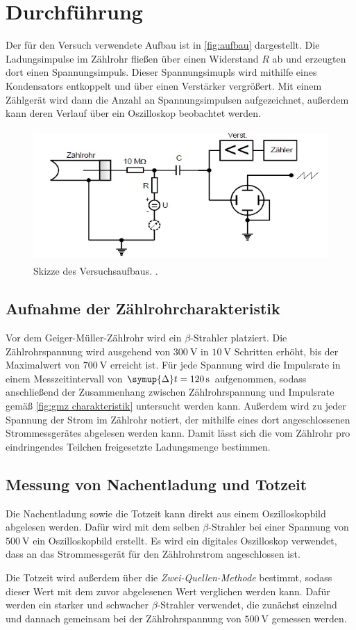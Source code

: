\section{Durchführung}
\label{sec:Durchführung}
Der für den Versuch verwendete Aufbau ist in \autoref{fig:aufbau} dargestellt.
Die Ladungsimpulse im Zählrohr fließen über einen Widerstand $R$ ab und erzeugten
dort einen Spannungsimpuls. Dieser Spannungsimupls wird mithilfe eines
Kondensators entkoppelt und über einen Verstärker vergrößert.
Mit einem Zählgerät wird dann die Anzahl an Spannungsimpulsen aufgezeichnet, außerdem
kann deren Verlauf über ein Oszilloskop beobachtet werden.

\begin{figure}[H]
    \centering
    \includegraphics[height=5cm]{content/pics/aufbau.jpg}
    \caption{Skizze des Versuchsaufbaus. \cite{v703}.}
    \label{fig:aufbau}
\end{figure}

\subsection{Aufnahme der Zählrohrcharakteristik}
Vor dem Geiger-Müller-Zählrohr wird ein $\beta$-Strahler platziert.
Die Zählrohrspannung wird ausgehend von $\qty{300}{\volt}$ in $\qty{10}{\volt}$ Schritten erhöht,
bis der Maximalwert von $\qty{700}{\volt}$ erreicht ist.
Für jede Spannung wird die Impulsrate in einem Messzeitintervall von $\symup{\Delta}t=\qty{120}{\second}$
aufgenommen, sodass anschließend der Zusammenhang zwischen Zählrohrspannung und Impulsrate
gemäß \autoref{fig:gmz charakteristik} untersucht werden kann.
Außerdem wird zu jeder Spannung der Strom im Zählrohr notiert, der mithilfe eines dort angeschlossenen
Strommessgerätes abgelesen werden kann. Damit lässt sich die vom Zählrohr pro eindringendes Teilchen
freigesetzte Ladungsmenge bestimmen.

\subsection{Messung von Nachentladung und Totzeit}
Die Nachentladung sowie die Totzeit kann direkt aus einem Oszilloskopbild abgelesen werden.
Dafür wird mit dem selben $\beta$-Strahler bei einer Spannung von $\qty{500}{\volt}$
ein Oszilloskopbild erstellt. Es wird ein digitales Oszilloskop verwendet, dass an das
Strommessgerät für den Zählrohrstrom angeschlossen ist.

Die Totzeit wird außerdem über die \textit{Zwei-Quellen-Methode} bestimmt, sodass dieser Wert mit dem
zuvor abgelesenen Wert verglichen werden kann. Dafür werden ein starker und schwacher $\beta$-Strahler
verwendet, die zunächst einzelnd und dannach gemeinsam bei der Zählrohrspannung von $\qty{500}{\volt}$
gemessen werden.